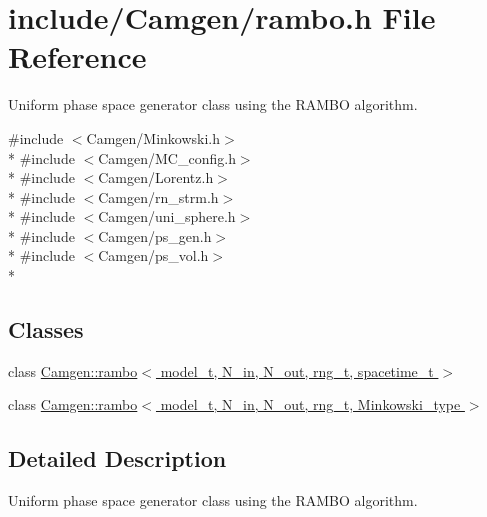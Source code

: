 \hypertarget{a00756}{}\section{include/\+Camgen/rambo.h File Reference}
\label{a00756}


Uniform phase space generator class using the R\+A\+M\+B\+O algorithm.  


{\ttfamily \#include $<$Camgen/\+Minkowski.\+h$>$}\\*
{\ttfamily \#include $<$Camgen/\+M\+C\+\_\+config.\+h$>$}\\*
{\ttfamily \#include $<$Camgen/\+Lorentz.\+h$>$}\\*
{\ttfamily \#include $<$Camgen/rn\+\_\+strm.\+h$>$}\\*
{\ttfamily \#include $<$Camgen/uni\+\_\+sphere.\+h$>$}\\*
{\ttfamily \#include $<$Camgen/ps\+\_\+gen.\+h$>$}\\*
{\ttfamily \#include $<$Camgen/ps\+\_\+vol.\+h$>$}\\*
\subsection*{Classes}
\begin{DoxyCompactItemize}
\item 
class \hyperlink{a00468}{Camgen\+::rambo$<$ model\+\_\+t, N\+\_\+in, N\+\_\+out, rng\+\_\+t, spacetime\+\_\+t $>$}
\item 
class \hyperlink{a00469}{Camgen\+::rambo$<$ model\+\_\+t, N\+\_\+in, N\+\_\+out, rng\+\_\+t, Minkowski\+\_\+type $>$}
\end{DoxyCompactItemize}


\subsection{Detailed Description}
Uniform phase space generator class using the R\+A\+M\+B\+O algorithm. 

